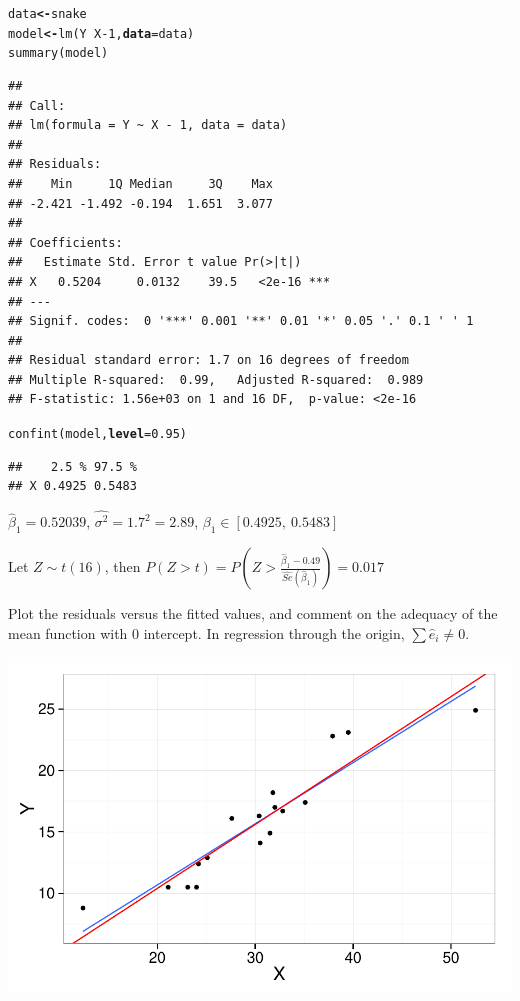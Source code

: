 \documentclass[12pt,oneside,a4paper]{article}\usepackage[]{graphicx}\usepackage[]{xcolor}
\makeatletter
\newcommand{\hlnum}[1]{\textcolor[rgb]{0,0,0}{#1}}%
\newcommand{\hlopt}[1]{\textcolor[rgb]{0,0,0}{#1}}%
\newcommand{\hlstd}[1]{\textcolor[rgb]{0,0,0}{#1}}%
\newcommand{\hlkwb}[1]{\textcolor[rgb]{0.498,0,0.333}{\textbf{#1}}}%
\newcommand{\hlkwc}[1]{\textcolor[rgb]{0.498,0,0.333}{\textbf{#1}}}%
\newcommand{\hlkwd}[1]{\textcolor[rgb]{0,0,0}{#1}}%
\newenvironment{kframe}{%
 \def\at@end@of@kframe{}%
 \ifinner\ifhmode%
  \def\at@end@of@kframe{\end{minipage}}%
  \begin{minipage}{\columnwidth}%
 \fi\fi%
 \def\FrameCommand##1{\hskip\@totalleftmargin \hskip-\fboxsep
 \colorbox{shadecolor}{##1}\hskip-\fboxsep
     \hskip-\linewidth \hskip-\@totalleftmargin \hskip\columnwidth}%
 \MakeFramed {\advance\hsize-\width
   \@totalleftmargin\z@ \linewidth\hsize
   \@setminipage}}%
 {\par\unskip\endMakeFramed%
 \at@end@of@kframe}
\newenvironment{knitrout}{}{} %
\newenvironment{problem}[2][Problem]{\begin{trivlist}
\item[\hskip \labelsep {\bfseries #1}\hskip \labelsep {\bfseries #2.}]}{\end{trivlist}}
\makeatother
\begin{document}
\begin{knitrout}
\color{fgcolor}\begin{kframe}
\begin{alltt}
\hlstd{data} \hlkwb{<-} \hlstd{snake}
\hlstd{model} \hlkwb{<-} \hlkwd{lm}\hlstd{(Y} \hlopt{~} \hlstd{X} \hlopt{-} \hlnum{1}\hlstd{,} \hlkwc{data} \hlstd{= data)}
\hlkwd{summary}\hlstd{(model)}
\end{alltt}
\begin{verbatim}
## 
## Call:
## lm(formula = Y ~ X - 1, data = data)
## 
## Residuals:
##    Min     1Q Median     3Q    Max 
## -2.421 -1.492 -0.194  1.651  3.077 
## 
## Coefficients:
##   Estimate Std. Error t value Pr(>|t|)    
## X   0.5204     0.0132    39.5   <2e-16 ***
## ---
## Signif. codes:  0 '***' 0.001 '**' 0.01 '*' 0.05 '.' 0.1 ' ' 1
## 
## Residual standard error: 1.7 on 16 degrees of freedom
## Multiple R-squared:  0.99,	Adjusted R-squared:  0.989 
## F-statistic: 1.56e+03 on 1 and 16 DF,  p-value: <2e-16
\end{verbatim}
\begin{alltt}
\hlkwd{confint}\hlstd{(model,} \hlkwc{level} \hlstd{=} \hlnum{0.95}\hlstd{)}
\end{alltt}
\begin{verbatim}
##    2.5 % 97.5 %
## X 0.4925 0.5483
\end{verbatim}
\end{kframe}
\end{knitrout}

\noindent $\hat{\beta}_{1} = 0.52039$, $\hat{\sigma^2} = 1.7 ^ 2 = 2.89$, $\beta_{1} \in [0.4925,~0.5483]$

\noindent Let $Z \sim t(16)$, then $P(Z > t) = P(Z > \frac{\hat{\beta}_{1} - 0.49}{\hat{Se}(\hat{\beta}_{1})}) = 0.017$

\begin{problem}{2.17.3}
Plot the residuals versus the fitted values, and comment on the
adequacy of the mean function with 0 intercept. In regression
through the origin, $\sum{\hat{e}_{i}} \neq 0$.
\end{problem}

\begin{knitrout}
\color{fgcolor}

{\centering \includegraphics[width=.6\linewidth]{figure/p21731} 

}



\end{knitrout}
\end{document}
